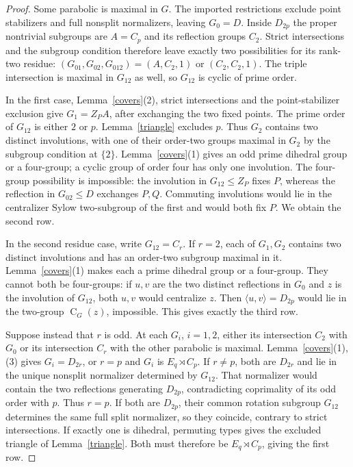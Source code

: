 \documentclass[11pt,a4paper]{article}
\newcommand{\C}{\operatorname{C}}
\newcommand{\gen}[1]{\langle#1\rangle}
\begin{document}
\begin{proof}
Some parabolic is maximal in $G$. The imported restrictions exclude
point stabilizers and full nonsplit normalizers, leaving $G_0=D$.
Inside $D_{2p}$ the proper nontrivial subgroups are $A=C_p$ and its
reflection groups $C_2$. Strict intersections and the subgroup condition
therefore leave exactly two possibilities for its rank-two residue:
$(G_{01},G_{02},G_{012})=(A,C_2,1)$ or $(C_2,C_2,1)$.
The triple intersection is maximal in $G_{12}$ as well, so $G_{12}$
is cyclic of prime order.

In the first case, Lemma~\ref{covers}(2), strict intersections and the
point-stabilizer exclusion give $G_1=Z_PA$, after exchanging the two
fixed points. The prime order of $G_{12}$ is either $2$ or $p$.
Lemma~\ref{triangle} excludes $p$. Thus $G_2$ contains two distinct
involutions, with one of their order-two groups maximal in $G_2$ by
the subgroup condition at $\{2\}$. Lemma~\ref{covers}(1) gives an
odd prime dihedral group or a four-group; a cyclic group of order four
has only one involution. The four-group possibility is impossible:
the involution in $G_{12}\le Z_P$ fixes $P$, whereas the reflection
in $G_{02}\le D$ exchanges $P,Q$. Commuting involutions would lie
in the centralizer Sylow two-subgroup of the first and would both
fix $P$. We obtain the second row.

In the second residue case, write $G_{12}=C_r$. If $r=2$, each of
$G_1,G_2$ contains two distinct involutions and has an order-two
subgroup maximal in it. Lemma~\ref{covers}(1) makes each a prime
dihedral group or a four-group. They cannot both be four-groups:
if $u,v$ are the two distinct reflections in $G_0$ and $z$ is the
involution of $G_{12}$, both $u,v$ would centralize $z$. Then
$\gen{u,v}=D_{2p}$ would lie in the two-group $\C_G(z)$, impossible.
This gives exactly the third row.

Suppose instead that $r$ is odd. At each $G_i$, $i=1,2$, either
its intersection $C_2$ with $G_0$ or its intersection $C_r$ with the
other parabolic is maximal. Lemma~\ref{covers}(1),(3) gives
$G_i=D_{2r}$, or $r=p$ and $G_i$ is $E_q\rtimes C_p$.
If $r\ne p$, both are $D_{2r}$ and lie in the unique nonsplit
normalizer determined by $G_{12}$. That normalizer would contain
the two reflections generating $D_{2p}$, contradicting coprimality
of its odd order with $p$. Thus $r=p$.
If both are $D_{2p}$, their common rotation subgroup $G_{12}$
determines the same full split normalizer, so they coincide, contrary
to strict intersections. If exactly one is dihedral, permuting types
gives the excluded triangle of Lemma~\ref{triangle}. Both must therefore
be $E_q\rtimes C_p$, giving the first row.
\end{proof}
\end{document}
